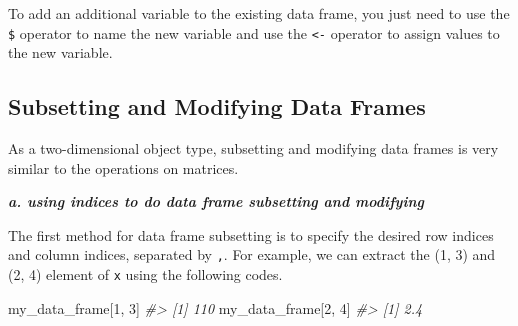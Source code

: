 \documentclass[
]{book}
\newenvironment{Shaded}{\begin{snugshade}}{\end{snugshade}}
\newcommand{\CommentTok}[1]{\textcolor[rgb]{0.56,0.35,0.01}{\textit{#1}}}
\newcommand{\DecValTok}[1]{\textcolor[rgb]{0.00,0.00,0.81}{#1}}
\newcommand{\NormalTok}[1]{#1}
\newcommand{\OtherTok}[1]{\textcolor[rgb]{0.56,0.35,0.01}{#1}}
\newcommand{\SpecialCharTok}[1]{\textcolor[rgb]{0.00,0.00,0.00}{#1}}
\begin{document}
To add an additional variable to the existing data frame, you just need to use the \texttt{\$} operator to name the new variable and use the \texttt{\textless{}-} operator to assign values to the new variable.

\begin{Shaded}
\end{Shaded}

\hypertarget{subset_df}{%
\subsection{Subsetting and Modifying Data Frames}\label{subset_df}}

As a two-dimensional object type, subsetting and modifying data frames is very similar to the operations on matrices.

\textbf{\emph{a. using indices to do data frame subsetting and modifying}}

The first method for data frame subsetting is to specify the desired row indices and column indices, separated by \texttt{,}. For example, we can extract the (1, 3) and (2, 4) element of \texttt{x} using the following codes.

\begin{Shaded}
\begin{Highlighting}[]
\NormalTok{my\_data\_frame[}\DecValTok{1}\NormalTok{, }\DecValTok{3}\NormalTok{]}
\CommentTok{\#\textgreater{} [1] 110}
\NormalTok{my\_data\_frame[}\DecValTok{2}\NormalTok{, }\DecValTok{4}\NormalTok{]}
\CommentTok{\#\textgreater{} [1] 2.4}
\end{Highlighting}
\end{Shaded}
\end{document}
